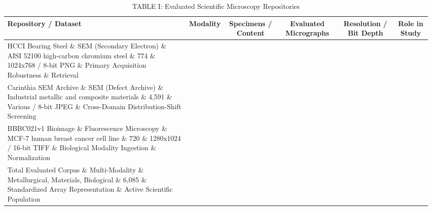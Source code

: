 \begin{table}[t]
\centering
\caption{TABLE I: Evaluated Scientific Microscopy Repositories}
\label{tab:table1_dataset_composition}
\begin{tabular}{lccccc}
\hline
\textbf{Repository / Dataset} & \textbf{Modality} & \textbf{Specimens / Content} & \textbf{Evaluated Micrographs} & \textbf{Resolution / Bit Depth} & \textbf{Role in Study} \\
\hline
HCCI Bearing Steel \& SEM (Secondary Electron) \& AISI 52100 high-carbon chromium steel \& 774 \& 1024x768 / 8-bit PNG \& Primary Acquisition Robustness \& Retrieval \\
Carinthia SEM Archive \& SEM (Defect Archive) \& Industrial metallic and composite materials \& 4,591 \& Various / 8-bit JPEG \& Cross-Domain Distribution-Shift Screening \\
BBBC021v1 Bioimage \& Fluorescence Microscopy \& MCF-7 human breast cancer cell line \& 720 \& 1280x1024 / 16-bit TIFF \& Biological Modality Ingestion \& Normalization \\
Total Evaluated Corpus \& Multi-Modality \& Metallurgical, Materials, Biological \& 6,085 \& Standardized Array Representation \& Active Scientific Population \\
\hline
\end{tabular}
\end{table}
